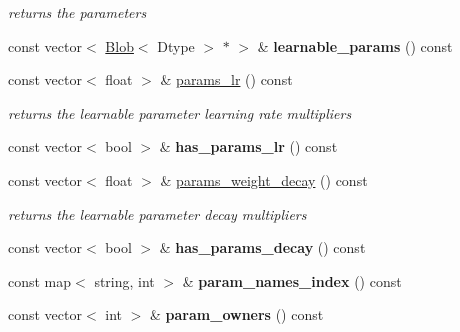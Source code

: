 \begin{DoxyCompactItemize}
\begin{DoxyCompactList}\small\item\em returns the parameters \end{DoxyCompactList}\item 
const vector$<$ \hyperlink{classcaffe_1_1Blob}{Blob}$<$ Dtype $>$ $\ast$ $>$ \& {\bfseries learnable\+\_\+params} () const \hypertarget{classcaffe_1_1Net_a4f2658374b5d887e11338449640cef3a}{}\label{classcaffe_1_1Net_a4f2658374b5d887e11338449640cef3a}

\item 
const vector$<$ float $>$ \& \hyperlink{classcaffe_1_1Net_ac1d393efc02a679eb45aefc6c9b9db78}{params\+\_\+lr} () const \hypertarget{classcaffe_1_1Net_ac1d393efc02a679eb45aefc6c9b9db78}{}\label{classcaffe_1_1Net_ac1d393efc02a679eb45aefc6c9b9db78}

\begin{DoxyCompactList}\small\item\em returns the learnable parameter learning rate multipliers \end{DoxyCompactList}\item 
const vector$<$ bool $>$ \& {\bfseries has\+\_\+params\+\_\+lr} () const \hypertarget{classcaffe_1_1Net_a016a2e2aeb215b7c1e6628a5432b0b09}{}\label{classcaffe_1_1Net_a016a2e2aeb215b7c1e6628a5432b0b09}

\item 
const vector$<$ float $>$ \& \hyperlink{classcaffe_1_1Net_abc294f841d9e2a7f1a152befc367b615}{params\+\_\+weight\+\_\+decay} () const \hypertarget{classcaffe_1_1Net_abc294f841d9e2a7f1a152befc367b615}{}\label{classcaffe_1_1Net_abc294f841d9e2a7f1a152befc367b615}

\begin{DoxyCompactList}\small\item\em returns the learnable parameter decay multipliers \end{DoxyCompactList}\item 
const vector$<$ bool $>$ \& {\bfseries has\+\_\+params\+\_\+decay} () const \hypertarget{classcaffe_1_1Net_a3be69d9ba6ae1aa1d18c5ccfad62d04d}{}\label{classcaffe_1_1Net_a3be69d9ba6ae1aa1d18c5ccfad62d04d}

\item 
const map$<$ string, int $>$ \& {\bfseries param\+\_\+names\+\_\+index} () const \hypertarget{classcaffe_1_1Net_a61fa2f7ce251efbd1c971e90eda17a2a}{}\label{classcaffe_1_1Net_a61fa2f7ce251efbd1c971e90eda17a2a}

\item 
const vector$<$ int $>$ \& {\bfseries param\+\_\+owners} () const \hypertarget{classcaffe_1_1Net_a5a6f95d25bd3389cf633dcf4090f96d7}{}\label{classcaffe_1_1Net_a5a6f95d25bd3389cf633dcf4090f96d7}


\end{DoxyCompactItemize}
